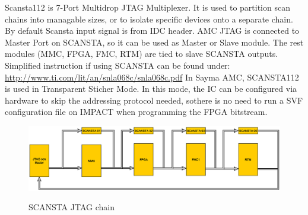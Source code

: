 Scansta112 is 7-Port Multidrop JTAG Multiplexer. It is used to partition scan chains into managable sizes, or to isolate specific devices onto a separate chain. By default Scansta input signal is from IDC header. AMC JTAG is connected to Master Port on SCANSTA, so it can be used as Master or Slave module. The rest modules (MMC, FPGA, FMC, RTM) are tied to slave SCANSTA outputs. \\
Simplified instruction if using SCANSTA can be found under: \href{http://www.ti.com/lit/an/snla068c/snla068c.pdf}{http://www.ti.com/lit/an/snla068c/snla068c.pdf} 
In Sayma AMC, SCANSTA112 is used in Transparent Sticher Mode. In this mode, the IC can be configured via hardware to skip the addressing protocol needed, sothere is no need to run a SVF configuration file on IMPACT when programming the FPGA bitstream.

		\begin{figure}[htbp!]
			\centering
			\includegraphics[scale=0.4]{img/jtagchain.eps}\\
			\caption{SCANSTA JTAG chain} 
		\end{figure}
